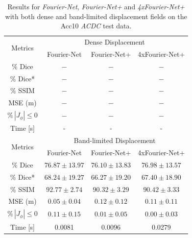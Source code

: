 \documentclass[english,version-2022-01]{uzl-thesis} %
\begin{document}
\begin{table}[H] %
	\centering
	\caption{Results for \emph{Fourier-Net}, \emph{Fourier-Net+} and \emph{4xFourier-Net+} with both dense and band-limited displacement fields on the Acc10 \emph{ACDC} test data.}
	\label{tab:DenseDisplacementAcc10}
	\begin{tabular}{c c c c} %
		\toprule
		\multirow{2}{*}{Metrics} & \multicolumn{3}{c}{Dense Displacement} \\
		\cline{2-4} 
		 & Fourier-Net & Fourier-Net+ & 4xFourier-Net+\\	
		\midrule
		$\%$ Dice & $-$ & $-$ & $-$\\
		$\%$ Dice* & $-$ & $-$ & $-$ \\
		$\%$ SSIM & $-$ & $-$ & $-$\\
		MSE (m) & $-$ & $-$ & $-$ \\
		$\% \, |J_{\phi}|\leq0$ & $-$ & $-$ & $-$ \\
		Time [s] 	  & - & - & -  \\
		\midrule
		\multirow{2}{*}{Metrics} & \multicolumn{3}{c}{Band-limited Displacement} \\
		\cline{2-4} 
		 & Fourier-Net & Fourier-Net+ & 4xFourier-Net+\\		
		\midrule
		$\%$ Dice & $76.87 \pm 13.97$ & $76.10 \pm 13.83$ & $76.98 \pm 13.57$\\
		$\%$ Dice* & $68.24 \pm 19.27$ & $66.27 \pm 19.20$ & $67.40 \pm 18.90$ \\
		$\%$ SSIM & $92.77 \pm 2.74$ & $90.32 \pm 3.29$ & $90.42 \pm 3.33$\\
		MSE (m) & $0.05 \pm 0.04$ & $0.12 \pm 0.12$ & $0.11 \pm 0.11$ \\
		$\% \, |J_{\phi}|\leq0$ & $0.11 \pm 0.15$ & $0.01 \pm 0.05$ & $0.00 \pm 0.03$ \\
		Time [s] 	  & 0.0081 & 0.0096 & 0.0279  \\
		\bottomrule
	\end{tabular}	
\end{table}
 
\newpage
\end{document}
